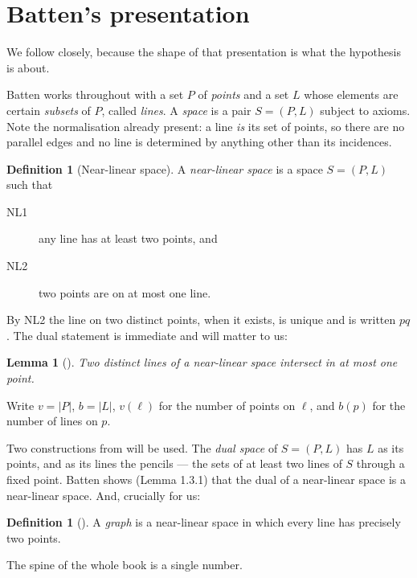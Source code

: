 \documentclass[11pt]{article}
\theoremstyle{plain}
\newtheorem{lemma}[theorem]{Lemma}
\theoremstyle{definition}
\newtheorem{definition}[theorem]{Definition}
\theoremstyle{remark}
\begin{document}
\section{Batten's presentation}
\label{sec:batten}

We follow \cite{Batten} closely, because the shape of that presentation is what the
hypothesis is about.

Batten works throughout with a set $P$ of \emph{points} and a set $L$ whose elements are
certain \emph{subsets} of $P$, called \emph{lines}. A \emph{space} is a pair $S = (P,L)$
subject to axioms. Note the normalisation already present: a line \emph{is} its set of
points, so there are no parallel edges and no line is determined by anything other than its
incidences.

\begin{definition}[Near-linear space]
A \emph{near-linear space} is a space $S = (P,L)$ such that
\begin{description}
\item[\textup{NL1}] any line has at least two points, and
\item[\textup{NL2}] two points are on at most one line.
\end{description}
\end{definition}

By NL2 the line on two distinct points, when it exists, is unique and is written $pq$. The
dual statement is immediate and will matter to us:

\begin{lemma}[{\cite[Lemma 1.2.1]{Batten}}]
\label{lem:meet}
Two distinct lines of a near-linear space intersect in at most one point.
\end{lemma}

Write $v = |P|$, $b = |L|$, $v(\ell)$ for the number of points on $\ell$, and $b(p)$ for
the number of lines on $p$.

Two constructions from \cite[\S1.3]{Batten} will be used. The \emph{dual space} of
$S = (P,L)$ has $L$ as its points, and as its lines the pencils --- the sets of at least
two lines of $S$ through a fixed point. Batten shows (Lemma 1.3.1) that the dual of a
near-linear space is a near-linear space. And, crucially for us:

\begin{definition}[{\cite[\S1.3]{Batten}}]
A \emph{graph} is a near-linear space in which every line has precisely two points.
\end{definition}

The spine of the whole book is a single number.
\end{document}
